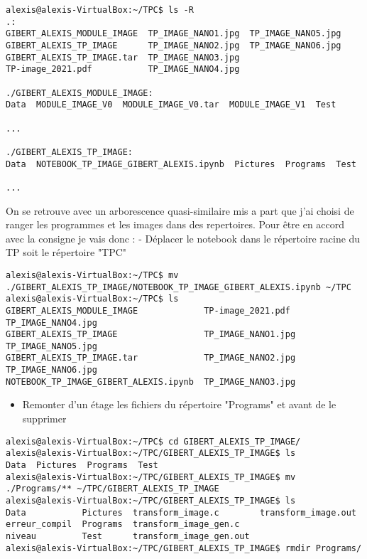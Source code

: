\documentclass[11pt]{article}
\providecommand{\tightlist}{%
      \setlength{\itemsep}{0pt}\setlength{\parskip}{0pt}}
\begin{document}
\begin{verbatim}
alexis@alexis-VirtualBox:~/TPC$ ls -R
.:
GIBERT_ALEXIS_MODULE_IMAGE  TP_IMAGE_NANO1.jpg  TP_IMAGE_NANO5.jpg
GIBERT_ALEXIS_TP_IMAGE      TP_IMAGE_NANO2.jpg  TP_IMAGE_NANO6.jpg
GIBERT_ALEXIS_TP_IMAGE.tar  TP_IMAGE_NANO3.jpg
TP-image_2021.pdf           TP_IMAGE_NANO4.jpg

./GIBERT_ALEXIS_MODULE_IMAGE:
Data  MODULE_IMAGE_V0  MODULE_IMAGE_V0.tar  MODULE_IMAGE_V1  Test

...

./GIBERT_ALEXIS_TP_IMAGE:
Data  NOTEBOOK_TP_IMAGE_GIBERT_ALEXIS.ipynb  Pictures  Programs  Test

...
\end{verbatim}

On se retrouve avec un arborescence quasi-similaire mis a part que j'ai
choisi de ranger les programmes et les images dans des repertoires. Pour
être en accord avec la consigne je vais donc : - Déplacer le notebook
dans le répertoire racine du TP soit le répertoire "TPC"

\begin{verbatim}
alexis@alexis-VirtualBox:~/TPC$ mv ./GIBERT_ALEXIS_TP_IMAGE/NOTEBOOK_TP_IMAGE_GIBERT_ALEXIS.ipynb ~/TPC
alexis@alexis-VirtualBox:~/TPC$ ls
GIBERT_ALEXIS_MODULE_IMAGE             TP-image_2021.pdf   TP_IMAGE_NANO4.jpg
GIBERT_ALEXIS_TP_IMAGE                 TP_IMAGE_NANO1.jpg  TP_IMAGE_NANO5.jpg
GIBERT_ALEXIS_TP_IMAGE.tar             TP_IMAGE_NANO2.jpg  TP_IMAGE_NANO6.jpg
NOTEBOOK_TP_IMAGE_GIBERT_ALEXIS.ipynb  TP_IMAGE_NANO3.jpg
\end{verbatim}

\begin{itemize}
\tightlist
\item
  Remonter d'un étage les fichiers du répertoire "Programs" et avant de
  le supprimer
\end{itemize}

\begin{verbatim}
alexis@alexis-VirtualBox:~/TPC$ cd GIBERT_ALEXIS_TP_IMAGE/
alexis@alexis-VirtualBox:~/TPC/GIBERT_ALEXIS_TP_IMAGE$ ls
Data  Pictures  Programs  Test
alexis@alexis-VirtualBox:~/TPC/GIBERT_ALEXIS_TP_IMAGE$ mv ./Programs/** ~/TPC/GIBERT_ALEXIS_TP_IMAGE
alexis@alexis-VirtualBox:~/TPC/GIBERT_ALEXIS_TP_IMAGE$ ls
Data           Pictures  transform_image.c        transform_image.out
erreur_compil  Programs  transform_image_gen.c
niveau         Test      transform_image_gen.out
alexis@alexis-VirtualBox:~/TPC/GIBERT_ALEXIS_TP_IMAGE$ rmdir Programs/
\end{verbatim}
\end{document}
